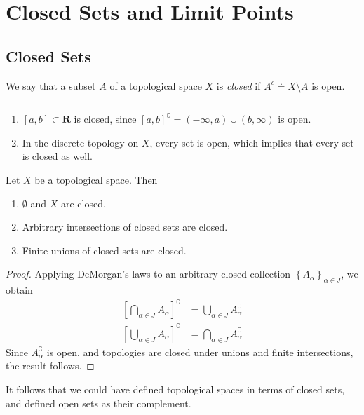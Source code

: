 \section{Closed Sets and Limit Points}
\subsection{Closed Sets}
\begin{definition}
	\label{def:closed-sets}
	We say that a subset $A$ of a topological space $X$ is \emph{closed} if
	$A^{c} \doteq X \setminus A$ is open.
\end{definition}
\begin{example} $ $
	\begin{enumerate}
		\item $[a,b] \subset \mathbf{R}$ is closed, since
			$[a,b]^{\complement} = (-\infty, a) \cup (b, \infty)$ is open.
		\item In the discrete topology on $X$, every set is open, which implies
			that every set is closed as well.
	\end{enumerate}
\end{example}
\begin{lemma}
	\label{lem:equiv-closed-def-top}
	Let $X$ be a topological space. Then
	\begin{enumerate}
		\item $\emptyset$ and $X$ are closed.
		\item Arbitrary intersections of closed sets are closed.
		\item Finite unions of closed sets are closed.
	\end{enumerate}
\end{lemma}
\begin{proof}
	Applying DeMorgan's laws to an arbitrary closed collection
	$\left\{ A_{\alpha} \right\}_{\alpha \in J}$, we obtain
	\begin{align*}
		\left[ \bigcap_{\alpha \in J}A_{\alpha} \right]^{\complement} & = \bigcup_{\alpha \in
		J} A_{\alpha}^{\complement} \\
		\left[ \bigcup_{\alpha \in J}A_{\alpha} \right]^{\complement} & = \bigcap_{\alpha \in
		J} A_{\alpha}^{\complement}
	\end{align*}
	Since $A_{\alpha}^{\complement}$ is open, and topologies are closed under
	unions and finite intersections, the result follows.
\end{proof}
\begin{remark}
	\label{rem:equiv-closed-def-top}
	It follows that we could have defined topological spaces in terms of closed
	sets, and defined open sets as their complement.
\end{remark}
